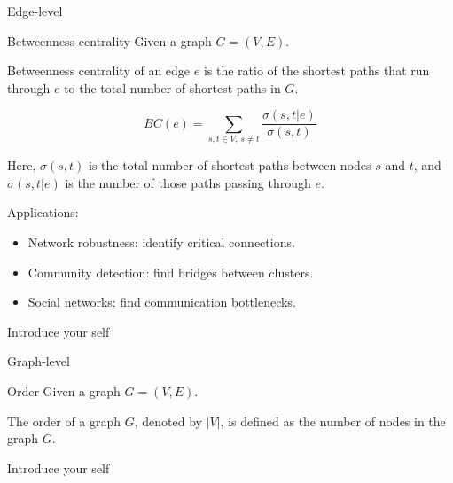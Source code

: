 \documentclass[aspectratio=169]{beamer}
\begin{document}
    \begin{frame}{Edge-level}
        \begin{exampleblock}{Betweenness centrality}
            Given a graph $G = (V, E)$.
            
            Betweenness centrality of an edge $e$ is the ratio of the shortest paths that run through $e$ to the total number of shortest paths in $G$.
        \end{exampleblock}

        \begin{equation}
            BC(e) = {\sum_{s, t \in V ,\, s \neq t} \frac{\sigma(s, t | e)}{\sigma(s, t)}}
        \end{equation}

        Here, $\sigma(s, t)$ is the total number of shortest paths between nodes $s$ and $t$, and $\sigma(s, t | e)$ is the number of those paths passing through $e$. \newline
        
        Applications:
        \begin{itemize}
            \item Network robustness: identify critical connections.
            \item Community detection: find bridges between clusters.
            \item Social networks: find communication bottlenecks.
        \end{itemize}

        \begin{note}
            {Introduce your self}
        \end{note}
    \end{frame}

    \begin{frame}{Graph-level}
        \begin{exampleblock}{Order}
            Given a graph $G = (V, E)$.
            
            The order of a graph $G$, denoted by $|V|$, is defined as the number of nodes in the graph $G$.
        \end{exampleblock}

        \begin{note}
            {Introduce your self}
        \end{note}
    \end{frame}
\end{document}
